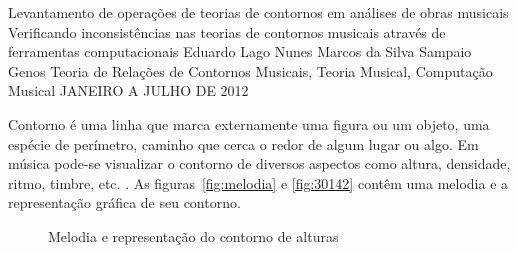 \documentclass[11pt]{article}
\begin{document}
\graphicspath{{figs/}}


\dadosRelatorioFinal
{Levantamento de operações de teorias de contornos em análises de
  obras musicais}
{Verificando inconsistências nas teorias de contornos musicais através
  de ferramentas computacionais }
{Eduardo Lago Nunes}
{Marcos da Silva Sampaio}
{Genos}
{Teoria de Relações de Contornos Musicais, Teoria Musical, Computação Musical}
{JANEIRO A JULHO DE 2012}


\newpage

\setcounter{page}{1}
\onehalfspace

\label{sec:introducao}

Contorno é uma linha que marca externamente uma figura ou um objeto,
uma espécie de perímetro, caminho que cerca o redor de algum lugar ou
algo. Em música pode-se visualizar o contorno de diversos aspectos
como altura, densidade, ritmo, timbre, etc.
\cite[p. 01]{Sampaio2008}.
As figuras~\ref{fig:melodia} e \ref{fig:30142} contêm uma melodia e a
representação gráfica de seu contorno.

\begin{figure}[h]
  \centering
  \caption{Melodia e representação do contorno de alturas}
  \label{fig:melodia-representacao}
\end{figure}
\end{document}
